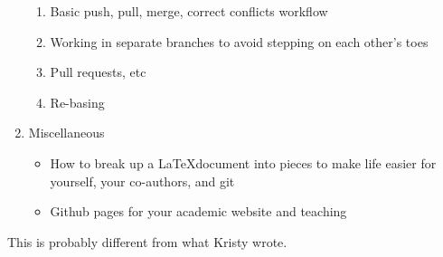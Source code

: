 \documentclass[12pt,letterpaper]{article}
\begin{document}
\begin{enumerate}
\begin{enumerate}
			\item Basic push, pull, merge, correct conflicts workflow
			\item Working in separate branches to avoid stepping on each other's toes
			\item Pull requests, etc 
			\item Re-basing
		\end{enumerate}
	\item Miscellaneous
		\begin{itemize}
			\item How to break up a \LaTeX document into pieces to make life easier for yourself, your co-authors, and git
			\item Github pages for your academic website and teaching
		\end{itemize}
\end{enumerate}
This is probably different from what Kristy wrote.	
\end{document}

